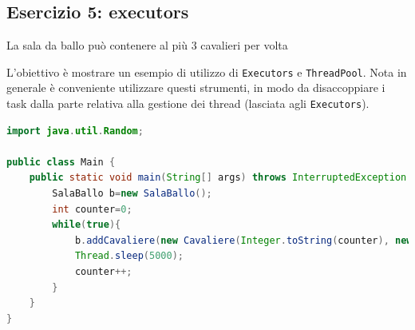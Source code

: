 \documentclass{article}
\begin{document}
\subsection{Esercizio 5: executors}
\begin{framed}
La sala da ballo pu\`o contenere al pi\`u 3 cavalieri per volta 
\end{framed}
L'obiettivo \`e mostrare un esempio di utilizzo di \texttt{Executors} e \texttt{ThreadPool}. Nota in generale \`e conveniente utilizzare questi strumenti, in modo da disaccoppiare i task dalla parte relativa alla gestione dei thread (lasciata agli  \texttt{Executors}).

\begin{lstlisting}[language=Java]
import java.util.Random;

public class Main {
	public static void main(String[] args) throws InterruptedException {
		SalaBallo b=new SalaBallo();
		int counter=0;
		while(true){
			b.addCavaliere(new Cavaliere(Integer.toString(counter), new Random(), b));
			Thread.sleep(5000);
			counter++;
		}
	}
}
\end{lstlisting}
\end{document}
